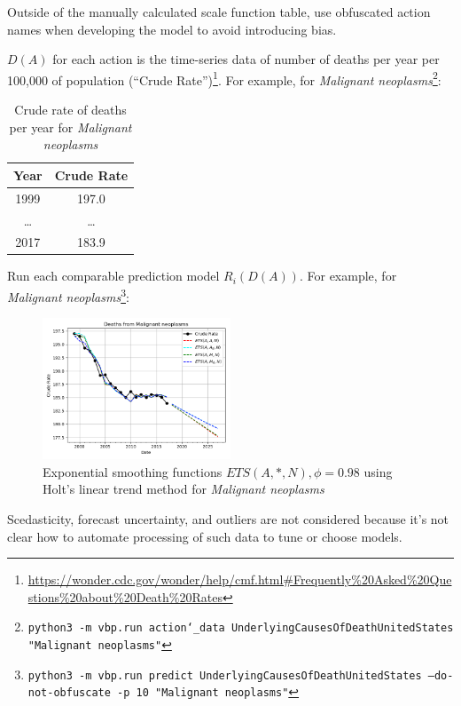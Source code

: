 \documentclass[12pt, a4paper, twocolumn]{article}
\begin{document}
Outside of the manually calculated scale function table, use obfuscated action names when developing the model to avoid introducing bias.

$D(A)$ for each action is the time-series data of number of deaths per year per 100,000 of population (\enquote{Crude Rate})\footnote{\url{https://wonder.cdc.gov/wonder/help/cmf.html\#Frequently\%20Asked\%20Questions\%20about\%20Death\%20Rates}}. For example, for \textit{Malignant neoplasms}\footnote{\texttt{python3 -m vbp.run action\char`_data UnderlyingCausesOfDeathUnitedStates "Malignant neoplasms"}}:

\begin{table}[H]
  \centering
  \begin{tabular}{cc}
    \toprule
      Year   & Crude Rate \\
    \midrule
      1999   &      197.0 \\
      \ldots &     \ldots \\
      2017   &      183.9 \\
    \bottomrule
  \end{tabular}
  \caption{Crude rate of deaths per year for \textit{Malignant neoplasms}}
  \label{table:daa1}
\end{table}

Run each comparable prediction model $R_i(D(A))$. For example, for \textit{Malignant neoplasms}\footnote{\texttt{python3 -m vbp.run predict UnderlyingCausesOfDeathUnitedStates --do-not-obfuscate -p 10 "Malignant neoplasms"}}:

\begin{figure}[H]
  \centering
  \includegraphics[width=0.5\textwidth]{Malignant_neoplasms_ets.png}
  \caption{Exponential smoothing functions $ETS(A,*,N),\phi=0.98$ using Holt's linear trend method for \textit{Malignant neoplasms}}\label{fig:neoplasmregs}
\end{figure}

Scedasticity, forecast uncertainty, and outliers are not considered because it's not clear how to automate processing of such data to tune or choose models.
\end{document}
